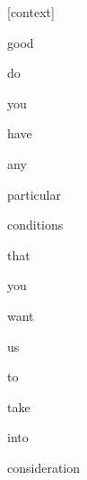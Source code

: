 \documentclass[varwidth]{standalone}
\begin{document}
\begin{CJK*}{UTF8}{gbsn}
{\setlength{\fboxsep}{0pt}\colorbox{white!0}{\parbox{0.9\textwidth}{
\colorbox{red!2.6155833126369735e-17}{\strut [context]} \colorbox{red!1.0746584733212217e-09}{\strut good} \colorbox{red!4.540393092611339e-07}{\strut do} \colorbox{red!4.3029905327784945e-07}{\strut you} \colorbox{red!2.4169190737666213e-07}{\strut have} \colorbox{red!0.001580354175530374}{\strut any} \colorbox{red!0.031995490193367004}{\strut particular} \colorbox{red!63.101844787597656}{\strut conditions} \colorbox{red!0.5419384837150574}{\strut that} \colorbox{red!0.21139110624790192}{\strut you} \colorbox{red!0.2840733826160431}{\strut want} \colorbox{red!0.15126989781856537}{\strut us} \colorbox{red!0.0259843822568655}{\strut to} \colorbox{red!0.0031986443791538477}{\strut take} \colorbox{red!0.06859920173883438}{\strut into} \colorbox{red!35.578125}{\strut consideration} 
}}}
\end{CJK*}
\end{document}

